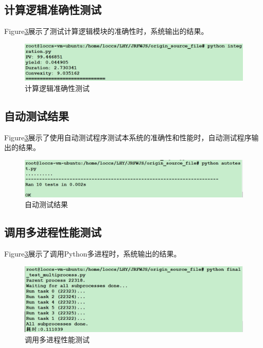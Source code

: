 \subsection{计算逻辑准确性测试}
Figure\ref{fig:sys.param}展示了测试计算逻辑模块的准确性时，系统输出的结果。
\begin{figure}[H]
\begin{center}
\includegraphics[width=16cm]{img//integration.PNG}
\caption{计算逻辑准确性测试}
\label{fig:sys.param}
\end{center}
\end{figure}


\subsection{自动测试结果}
Figure\ref{fig:sys.param}展示了使用自动测试程序测试本系统的准确性和性能时，自动测试程序输出的结果。
\begin{figure}[H]
\begin{center}
\includegraphics[width=16cm]{img//autotest.PNG}
\caption{自动测试结果}
\label{fig:sys.param}
\end{center}
\end{figure}


\subsection{调用多进程性能测试}
Figure\ref{fig:sys.param}展示了调用Python多进程时，系统输出的结果。
\begin{figure}[H]
\begin{center}
\includegraphics[width=16cm]{img//final_test_multiprocess.PNG}
\caption{调用多进程性能测试}
\label{fig:sys.param}
\end{center}
\end{figure}


